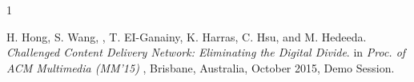 \begin{thebibliography}{1}

H. Hong, S. Wang, , T. EI-Ganainy, K. Harras, C. Hsu, and M. Hedeeda.
\newblock \emph{Challenged Content Delivery Network: Eliminating the Digital Divide}.
\newblock in \emph{ Proc. of ACM Multimedia (MM’15) }, Brisbane, Australia, October 2015, Demo Session.




\end{thebibliography}

